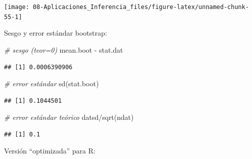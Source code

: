 \documentclass[
]{book}
\newenvironment{Shaded}{\begin{snugshade}}{\end{snugshade}}
\newcommand{\CommentTok}[1]{\textcolor[rgb]{0.56,0.35,0.01}{\textit{#1}}}
\newcommand{\FunctionTok}[1]{\textcolor[rgb]{0.00,0.00,0.00}{#1}}
\newcommand{\NormalTok}[1]{#1}
\newcommand{\SpecialCharTok}[1]{\textcolor[rgb]{0.00,0.00,0.00}{#1}}
\theoremstyle{break}
\theoremstyle{definition}
\theoremstyle{definition}
\theoremstyle{definition}
\theoremstyle{definition}
\theoremstyle{remark}
\begin{document}
\begin{center}\texttt{[image: 08-Aplicaciones\_Inferencia\_files/figure-latex/unnamed-chunk-55-1]} \end{center}

Sesgo y error estándar bootstrap:

\begin{Shaded}
\begin{Highlighting}[]
\CommentTok{\# sesgo (teor=0)}
\NormalTok{mean.boot }\SpecialCharTok{{-}}\NormalTok{ stat.dat }
\end{Highlighting}
\end{Shaded}

\begin{verbatim}
## [1] 0.0006390906
\end{verbatim}

\begin{Shaded}
\begin{Highlighting}[]
\CommentTok{\# error estándar}
\FunctionTok{sd}\NormalTok{(stat.boot) }
\end{Highlighting}
\end{Shaded}

\begin{verbatim}
## [1] 0.1044501
\end{verbatim}

\begin{Shaded}
\begin{Highlighting}[]
\CommentTok{\# error estándar teórico}
\NormalTok{datsd}\SpecialCharTok{/}\FunctionTok{sqrt}\NormalTok{(ndat) }
\end{Highlighting}
\end{Shaded}

\begin{verbatim}
## [1] 0.1
\end{verbatim}

Versión ``optimizada'' para R:
\end{document}
